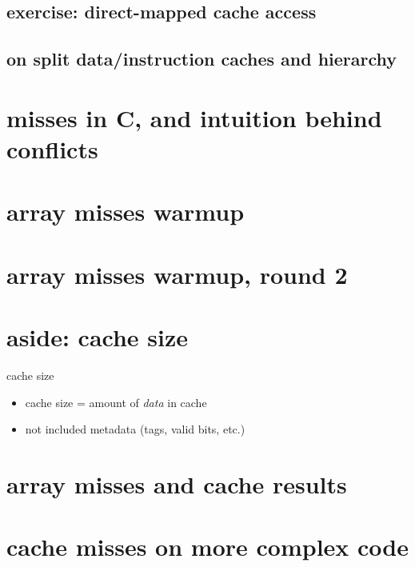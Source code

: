 \subsection{exercise: direct-mapped cache access}


\subsection{on split data/instruction caches and hierarchy}


\section{misses in C, and intuition behind conflicts}


\section{array misses warmup}


\section{array misses warmup, round 2}


\section{aside: cache size}
\begin{frame}{cache size}
    \begin{itemize}
    \item cache size = amount of \textit{data} in cache
    \item not included metadata (tags, valid bits, etc.)
    \end{itemize}
\end{frame}

\section{array misses and cache results}


\section{cache misses on more complex code}


